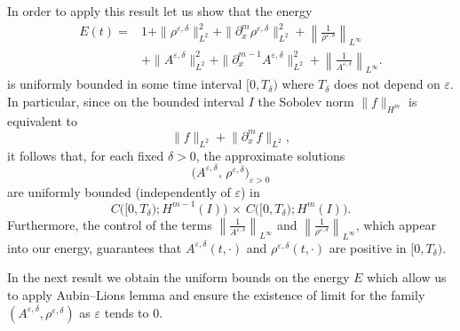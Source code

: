 \documentclass[12pt]{amsart}
\begin{document}
	
	In order to apply this result let us show that the energy
	\[
        \begin{split}
            E(t)=& 1+\|\rho^{\varepsilon,\delta}\|_{L^2}^2+\|\partial_{x}^{m}\rho^{\varepsilon,\delta}\|_{L^2}^2+\left\| \frac{1}{\rho^{\varepsilon,\delta}}\right\|_{L^\infty} \\&+ \|A^{\varepsilon,\delta}\|_{L^2}^2+\|\partial_x^{m-1}A^{\varepsilon,\delta}\|_{L^2}^2+\left\| \frac{1}{A^{\varepsilon,\delta}}\right\|_{L^\infty}.
        \end{split}
        \]
	is uniformly bounded in some time interval $[0,T_\delta)$ where $T_\delta$ does not depend on $\varepsilon$. In particular, since on the bounded interval $I$ the Sobolev norm $\|f\|_{H^m}$ is equivalent to 
\[
\|f\|_{L^2} + \bigl\|\partial_x^m f\bigr\|_{L^2},
\]
it follows that, for each fixed $\delta>0$, the approximate solutions 
\[
\bigl(A^{\varepsilon,\delta},\,\rho^{\varepsilon,\delta}\bigr)_{\varepsilon>0}
\]
are uniformly bounded (independently of $\varepsilon$) in 
\[
C\bigl([0,T_\delta);H^{m-1}(I)\bigr)\,\times\,C\bigl([0,T_\delta);H^m(I)\bigr).
\] 
Furthermore, the  control of the terms $\left\| \frac{1}{A^{\varepsilon,\delta}}\right\|_{L^\infty}$ and $\left\| \frac{1}{\rho^{\varepsilon,\delta}}\right\|_{L^\infty}$, which appear into  our energy, guarantees that $A^{\varepsilon,\delta}(t,\cdot)$ and $\rho^{\varepsilon,\delta}(t,\cdot)$  are positive in $[0,T_\delta)$. 

In the next result we obtain the uniform bounds on the energy $E$ which allow us to apply Aubin--Lions lemma and ensure the existence of limit for the family $(A^{\varepsilon,\delta},\rho^{\varepsilon,\delta})$ as $\varepsilon$ tends to $0$.
\end{document}
